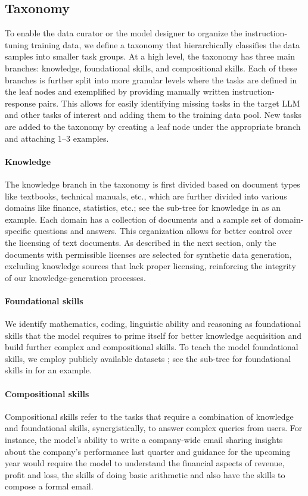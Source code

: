 \subsection{Taxonomy}\label{sec:tax}

To enable the data curator or the model designer to organize the instruction-tuning training data, we define a taxonomy that hierarchically classifies the data samples into smaller task groups. At a high level, the taxonomy has three main branches: knowledge, foundational skills, and compositional skills. Each of these branches is further split into more granular levels where the tasks are defined in the leaf nodes and exemplified by providing manually written instruction-response pairs. This allows for easily identifying missing tasks in the target LLM and other tasks of interest and adding them to the training data pool. New tasks are added to the taxonomy by creating a leaf node under the appropriate branch and attaching 1--3 examples.

\paragraph{Knowledge}
The knowledge branch in the taxonomy is first divided based on document types like textbooks, technical manuals, etc., which are further divided into various domains like finance, statistics, etc.; see the sub-tree for knowledge in  as an example. 
Each domain has a collection of documents and a sample set of domain-specific questions and answers.
This organization allows for better control over the licensing of text documents. As described in the next section, only the documents with permissible licenses are selected for synthetic data generation, excluding knowledge sources that lack proper licensing, reinforcing the integrity of our knowledge-generation processes. 

\paragraph{Foundational skills}
We identify mathematics, coding, linguistic ability and reasoning as foundational skills that the model requires to prime itself for better knowledge acquisition and build further complex and compositional skills.
To teach the model foundational skills, we employ publicly available datasets \citep{flan,mathins,conala,musique}; see the sub-tree for foundational skills in  for an example.

\paragraph{Compositional skills}
Compositional skills refer to the tasks that require a combination of knowledge and foundational skills, synergistically, to answer complex queries from users. For instance, the model's ability to write a company-wide email sharing insights about the company's performance last quarter and guidance for the upcoming year would require the model to understand the financial aspects of revenue, profit and loss, the skills of doing basic arithmetic and also have the skills to compose a formal email.

